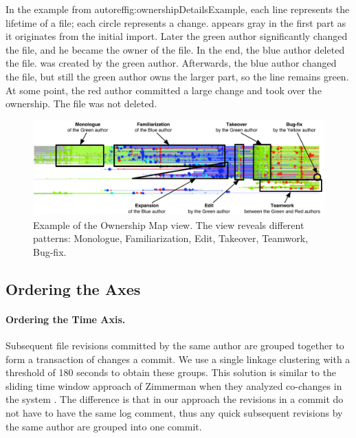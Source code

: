 In the example from autoref{fig:ownershipDetailsExample}, each line represents the lifetime of a file; each circle represents a change.  appears gray in the first part as it originates from the initial import. Later the green author significantly changed the file, and he became the owner of the file. In the end, the blue author deleted the file.  was created by the green author. Afterwards, the blue author changed the file, but still the green author owns the larger part, so the line remains green. At some point, the red author committed a large change and took over the ownership. The file was not deleted.

\begin{figure}[hbt]
\begin{center}
\includegraphics[width=\linewidth]{fig/hapax-owners-map-example}
\caption{Example of the Ownership Map view. The view reveals different patterns:
Monologue, Familiarization, Edit, Takeover, Teamwork, Bug-fix.}
\label{fig:ownershipMapExample}
\end{center}
\end{figure}

\subsection{Ordering the Axes}

\paragraph{Ordering the Time Axis.}
Subsequent file revisions committed by the same author are grouped together to form a transaction of changes \ie a commit. We use a single linkage clustering with a threshold of 180 seconds to obtain these groups. This solution is similar to the sliding time window approach of Zimmerman \etal when they analyzed co-changes in the system \cite{Zimm04a}. The difference is that in our approach the revisions in a commit do not have to have the same log comment, thus any quick subsequent revisions by the same author are grouped into one commit.

